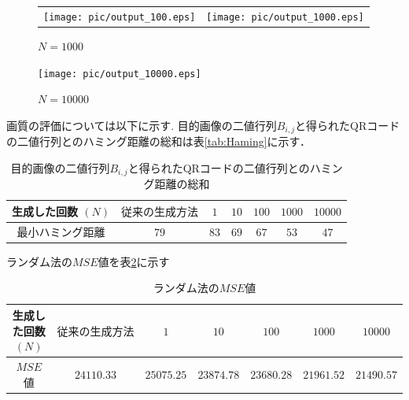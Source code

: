 \documentclass{thesis}
\begin{document}

\begin{figure}[H]
  \begin{tabular}{cc}
    \begin{minipage}[t]{0.45\hsize}
     \centering
      \texttt{[image: pic/output\_100.eps]}
      \caption{$N=100$}
      \label{fig:output_100}
    \end{minipage} &
    \begin{minipage}[t]{0.45\hsize}
     \centering
      \texttt{[image: pic/output\_1000.eps]}
       \caption{$N=1000$}
      \label{fig:output_1000}
      \end{minipage}
  \end{tabular}
\end{figure}


\begin{figure}[H]
 
    
      \centering
      \texttt{[image: pic/output\_10000.eps]}
       \caption{$N=10000$}
      \label{fig:output_10000}
    
\end{figure}

画質の評価については以下に示す.
目的画像の二値行列$B_{i,j}$と得られたQRコードの二値行列とのハミング距離の総和は表\ref{tab:Haming}に示す．

\begin{table}[H]
	\caption{目的画像の二値行列$B_{i,j}$と得られたQRコードの二値行列とのハミング距離の総和}
	\begin{center}
  		\begin{tabular}{|c|c|c|c|c|c|c|} \hline
     			生成した回数 $(N) $& $従来の生成方法$ & $1$ & $10$ & $100$ & $1000$ & $10000$  \\  \hline
   			最小ハミング距離 & $79$& $83$ & $69$ & $67$ & $53$ & $47$\\ \hline
     		\end{tabular}
  	\end{center}
  \label{Haming}
\end{table}
 
ランダム法の$MSE$値を表\ref{tab:MSE}に示す

\begin{table}[H]
	\caption{ランダム法の$MSE$値}
	\begin{center}
  		\begin{tabular}{|c|c|c|c|c|c|c|} \hline
     			生成した回数 $(N) $& $従来の生成方法$ & $1$ & $10$ & $100$ & $1000$ & $10000$  \\  \hline
   			$MSE$値 & $24110.33$& $25075.25$ & $23874.78$ & $23680.28$ & $21961.52$ & $21490.57$\\ \hline
     		\end{tabular}
  	\end{center}
  \label{tab:MSE}
\end{table}
\end{document}
